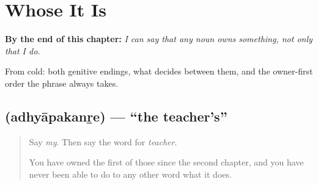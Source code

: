 
\chapter{Whose It Is}
\label{ch:ml-genitive}

\begin{chapteropening}
\textbf{By the end of this chapter:} \emph{I can say that any noun owns something, not only that I do.}

From cold: both genitive endings, what decides between them, and the owner-first order the phrase always takes.
\end{chapteropening}

\section[\texorpdfstring{\ml{അധ്യാപകന്റെ} (adhyāpakanṟe)}{അധ്യാപകന്റെ (adhyāpakanṟe)}]{ (adhyāpakanṟe) — \textquotedblleft{}the teacher's\textquotedblright{}}

\label{lesson:ML-C78-nre}



\begin{quote}
Say \emph{my}. Then say the word for \emph{teacher}.

You have owned the first of those since the second chapter, and you have never been able to do to any other word what it does.
\end{quote}

